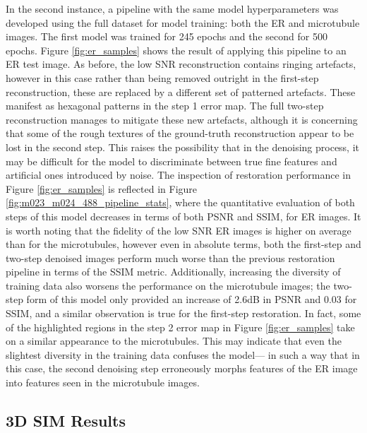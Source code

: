 \documentclass[12pt]{article}
\begin{document}
In the second instance, a pipeline with the same model hyperparameters was developed using the full dataset for model training:
both the ER and microtubule images.
The first model was trained for 245 epochs and the second for 500 epochs.
Figure \ref{fig:er_samples} shows the result of applying this pipeline to an ER test image.
As before, the low SNR reconstruction contains ringing artefacts,
however in this case rather than being removed outright in the first-step reconstruction,
these are replaced by a different set of patterned artefacts.
These manifest as hexagonal patterns in the step 1 error map.
The full two-step reconstruction manages to mitigate these new artefacts,
although it is concerning that some of the rough textures of the ground-truth reconstruction appear to be lost in the second step.
This raises the possibility that in the denoising process,
it may be difficult for the model to discriminate between true fine features and artificial ones introduced by noise.
The inspection of restoration performance in Figure \ref{fig:er_samples} is reflected in Figure \ref{fig:m023_m024_488_pipeline_stats},
where the quantitative evaluation of both steps of this model decreases in terms of both PSNR and SSIM, for ER images.
It is worth noting that the fidelity of the low SNR ER images is higher on average than for the microtubules,
however even in absolute terms, both the first-step and two-step denoised images perform much worse than the previous restoration pipeline in terms of the SSIM metric.
Additionally, increasing the diversity of training data also worsens the performance on the microtubule images;
the two-step form of this model only provided an increase of 2.6dB in PSNR and 0.03 for SSIM,
and a similar observation is true for the first-step restoration.
In fact, some of the highlighted regions in the step 2 error map in Figure \ref{fig:er_samples} take on a similar appearance to the microtubules.
This may indicate that even the slightest diversity in the training data confuses the model---
in such a way that in this case,
the second denoising step erroneously morphs features of the ER image into features seen in the microtubule images.

\subsection{3D SIM Results}
\end{document}
